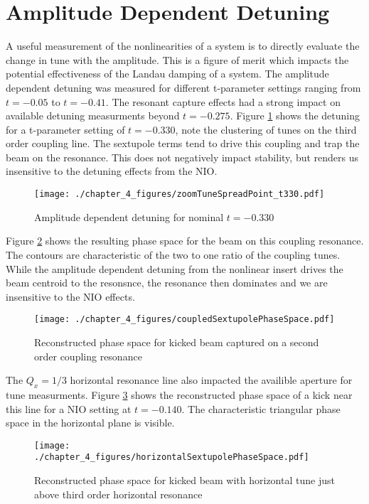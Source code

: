 \section{Amplitude Dependent Detuning} \label{sec:ampDetune}
A useful measurement of the nonlinearities of a system is to directly evaluate the change in tune with the amplitude. This is a figure of merit which impacts the potential effectiveness of the Landau damping of a system. The amplitude dependent detuning was measured for different t-parameter settings ranging from $t=-0.05$ to $t=-0.41$. The resonant capture effects had a strong impact on available detuning measurments beyond $t=-0.275$. Figure \ref{fig:t330Detuning} shows the detuning for a t-parameter setting of $t=-0.330$, note the clustering of tunes on the third order coupling line. The sextupole terms tend to drive this coupling and trap the beam on the resonance. This does not negatively impact stability, but renders us insensitive to the detuning effects from the NIO.

\begin{figure}
	\centering
	\texttt{[image: ./chapter\_4\_figures/zoomTuneSpreadPoint\_t330.pdf]}
	\caption{Amplitude dependent detuning for nominal $t=-0.330$}
	\label{fig:t330Detuning}
\end{figure}


Figure \ref{fig:t330phaseSpace} shows the resulting phase space for the beam on this coupling resonance. The contours are characteristic of the two to one ratio of the coupling tunes. While the amplitude dependent detuning from the nonlinear insert drives the beam centroid to the resonsnce, the resonance then dominates and we are insensitive to the NIO effects.

\begin{figure}
	\centering
	\texttt{[image: ./chapter\_4\_figures/coupledSextupolePhaseSpace.pdf]}
	\caption{Reconstructed phase space for kicked beam captured on a second order coupling resonance}
	\label{fig:t330phaseSpace}
\end{figure}

The $Q_x = 1/3$ horizontal resonance line also impacted the availible aperture for tune measurments. Figure \ref{fig:t140phaseSpace} shows the reconstructed phase space of a kick near this line for a NIO setting at $t=-0.140$. The characteristic triangular phase space in the horizontal plane is visible.

\begin{figure}
	\centering
	\texttt{[image: ./chapter\_4\_figures/horizontalSextupolePhaseSpace.pdf]}
	\caption{Reconstructed phase space for kicked beam with horizontal tune just above third order horizontal resonance}
	\label{fig:t140phaseSpace}
\end{figure}


